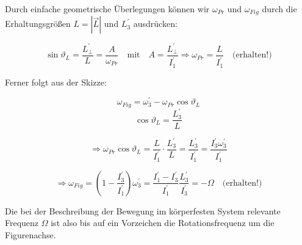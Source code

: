 \documentclass[10pt, letterpaper]{article}
\begin{document}
Durch einfache geometrische Überlegungen können wir $\omega_{Pr}$ und $\omega_{Fig}$ durch die Erhaltungsgrößen $L=|\vec{L}|$ und $L_3^\prime$ ausdrücken:


\[\sin \vartheta_L = \frac{L_\perp^\prime}{L} = \frac{A}{\omega_{Pr}} \quad \text{mit} \quad A = \frac{L_\perp^\prime}{I_1^\prime} \Rightarrow \omega_{Pr} = \frac{L}{I_1^\prime} \quad \text{(erhalten!)}\]

Ferner folgt aus der Skizze:

\[\omega_{Fig} = \omega_3^\prime - \omega_{Pr} \cos \vartheta_L\]
\[\cos \vartheta_L = \frac{L_3^\prime}{L}\]

\[\Rightarrow \omega_{Pr} \cos \vartheta_L = \frac{L}{I_1^\prime} \cdot \frac{L_3^\prime}{L} = \frac{L_3^\prime}{I_1^\prime} = \frac{I_3^\prime\omega_3^\prime}{I_1^\prime}\]

\[\Rightarrow \omega_{Fig} = (1-\frac{I_3^\prime}{I_1^\prime})\omega_3^\prime = \frac{I_1^\prime-I_3^\prime}{I_1^\prime}\frac{L_3^\prime}{I_3^\prime} = -\Omega \quad \text{(erhalten!)}\]

Die bei der Beschreibung der Bewegung im körperfesten System relevante Frequenz $\Omega$ ist also bis auf ein Vorzeichen die Rotationsfrequenz um die Figurenachse.


\pagebreak
\printbibliography
\end{document}
